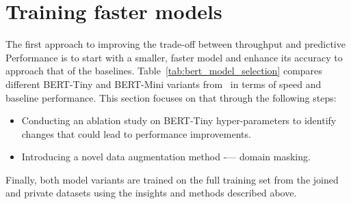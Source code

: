 \begin{table}[H]
    \centering
    \caption{Multi-class classification performance of selected models on the Kaggle Multiple dataset.}
    \label{tab:multiclass_kaggle_multiple}
\end{table}

\section{Training faster models}

The first approach to improving the trade-off between throughput and predictive Performance is to start with a smaller, faster model and enhance its accuracy to approach that of the baselines. Table~\ref{tab:bert_model_selection} compares different BERT-Tiny and BERT-Mini variants from~\cite{turc2019} in terms of speed and baseline performance. This section focuses on that through the following steps:
\begin{itemize}
    \item Conducting an ablation study on BERT-Tiny hyper-parameters to identify changes that could lead to performance improvements.
    \item Introducing a novel data augmentation method -— domain masking.
\end{itemize}
Finally, both model variants are trained on the full training set from the joined and private datasets using the insights and methods described above.

